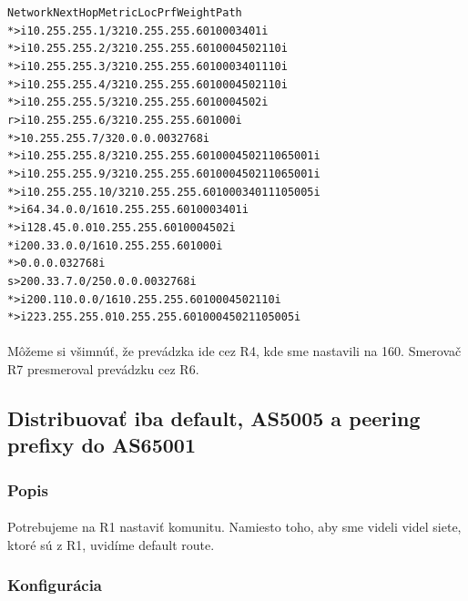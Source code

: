 \documentclass[12pt,twoside,a4paper]{report}
\begin{document}
{\begin{small}
\begin{alltt}
   Network          Next Hop        Metric LocPrf Weight Path
*>i10.255.255.1/32  10.255.255.6         0    100      0 3401 i
*>i10.255.255.2/32  10.255.255.6         0    100      0 4502 110 i
*>i10.255.255.3/32  10.255.255.6         0    100      0 3401 110 i
*>i10.255.255.4/32  10.255.255.6         0    100      0 4502 110 i
*>i10.255.255.5/32  10.255.255.6         0    100      0 4502 i
r>i10.255.255.6/32  10.255.255.6         0    100      0 i
*> 10.255.255.7/32  0.0.0.0              0         32768 i
*>i10.255.255.8/32  10.255.255.6         0    100      0 4502 110 65001 i
*>i10.255.255.9/32  10.255.255.6         0    100      0 4502 110 65001 i
*>i10.255.255.10/32 10.255.255.6         0    100      0 3401 110 5005 i
*>i64.34.0.0/16     10.255.255.6         0    100      0 3401 i
*>i128.45.0.0       10.255.255.6         0    100      0 4502 i
* i200.33.0.0/16    10.255.255.6         0    100      0 i
*>                  0.0.0.0                        32768 i
s> 200.33.7.0/25    0.0.0.0              0         32768 i
*>i200.110.0.0/16   10.255.255.6         0    100      0 4502 110 i
*>i223.255.255.0    10.255.255.6         0    100      0 4502 110 5005 i
\end{alltt}
\end{small}
}

\paragraph{}
Môžeme si všimnúť, že prevádzka ide cez R4, kde sme nastavili  na 160. Smerovač R7 presmeroval prevádzku cez R6.




\subsection{Distribuovať iba default, AS5005 a peering prefixy do AS65001}
\subsubsection{Popis}
\paragraph{}
Potrebujeme na R1 nastaviť komunitu. Namiesto toho, aby sme videli videl siete, ktoré sú z R1, uvidíme default route.

\subsubsection{Konfigurácia}
\end{document}
